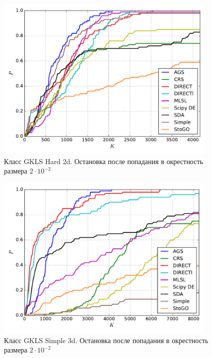 \documentclass[a4paper]{article}
\begin{document}

\begin{figure}[H]
  \center
  \includegraphics[width=0.95\textwidth]{../experiments/gklsh2d/cmc.pdf}
  \caption{Класс GKLS Hard 2d. Остановка после попадания в окрестность размера $2\cdot10^{-2}$}
  \label{fig:}
\end{figure}


\begin{figure}[H]
  \center
  \includegraphics[width=0.95\textwidth]{../experiments/gklss3d/cmc.pdf}
  \caption{Класс GKLS Simple 3d. Остановка после попадания в окрестность размера $2\cdot10^{-2}$}
  \label{fig:}
\end{figure}

\end{document}
